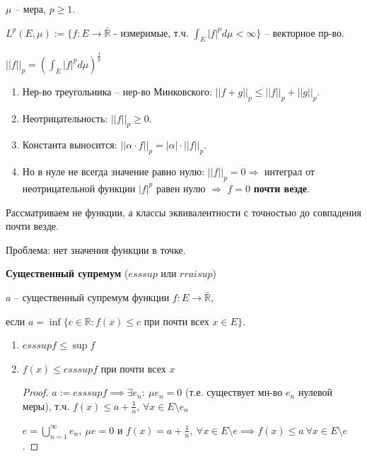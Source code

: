 
\begin{definition}
    $\mu$ -- мера, $p \geq 1$.

    $L^{p} (E, \mu) := \{f : E \rightarrow \bar{\mathbb{R}}$ - измеримые, т.ч. $\int_{E} |f|^p d\mu < \infty\}$  -- векторное пр-во.

    $|| f ||_p = \left( \int_{E} |f|^p d\mu \right)^{\frac{1}{p}}$

    \begin{enumerate}
        \item Нер-во треугольника -- нер-во Минковского: $||f+g||_p \leq ||f||_p + ||g||_p$.
        \item Неотрицательность: $|| f ||_{p} \geq 0$.
        \item Константа выносится: $|| \alpha \cdot f ||_p = |\alpha| \cdot ||f||_p$.
        \item Но в нуле не всегда значение равно нулю: $||f||_p = 0 \Rightarrow$ интеграл от неотрицательной функции $|f|^p$ равен нулю $\Rightarrow$ $f = 0$ \textbf{почти везде}.
    \end{enumerate}

    Рассматриваем не функции, а классы эквивалентности с точностью до совпадения почти везде.

    Проблема: нет значения функции в точке.
\end{definition}

\begin{definition}
    \textbf{Существенный супремум} ($esssup$ или $rraisup$)

    $a$ -- существенный супремум функции $f: E \rightarrow \bar{\mathbb{R}}$,

    если $a = \inf \{ c \in \mathbb{R} : f(x) \leq c \text{ при почти всех $x \in E$}\}$.
\end{definition}

\begin{properties}
    \begin{enumerate}
        \item $esssup f \leq \sup f$
        \item {
            $f(x) \leq esssup f$ при почти всех $x$

            \begin{proof}
                $a := esssup f \implies \exists e_n : \ \mu e_n = 0$ (т.е. существует мн-во $e_n$ нулевой меры), т.ч. $f(x) \leq a + \frac{1}{n}$, $\forall x \in E \setminus e_n$

                $e = \bigcup_{n=1}^{\infty} e_n, \ \mu e = 0$ и $f(x) = a + \frac{1}{n}, \ \forall x \in E \setminus e \implies f(x) \leq a \ \forall x \in E \setminus e$.
            \end{proof}
        }
    \end{enumerate}
\end{properties}

